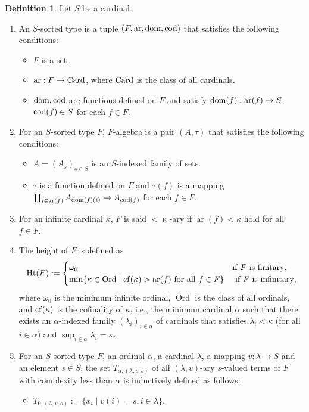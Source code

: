 \documentclass[a4paper,10pt]{article}
\theoremstyle{definition}
\newtheorem{df}{Definition}[section]
\newcommand\ra{\rightarrow}
\DeclareMathOperator{\Ord}{Ord}
\newcommand\mc{\mathclose}
\DeclareMathOperator{\ari}{ar}
\DeclareMathOperator{\Ht}{Ht}
\newcommand\dom{{\rm dom}}
\newcommand\cod{{\rm cod}}
\begin{document}
\begin{df}
Let $S$ be a cardinal.
\begin{enumerate}
\item
An $S$-sorted type is a tuple $(F,\ari,\dom,\cod)$ that satisfies the following conditions:
\begin{itemize}
\item
$F$ is a set.
\item
$\ari:F\ra {\rm Card}$, where ${\rm Card}$ is the class of all cardinals.
\item
$\dom,\cod$ are functions defined on $F$ and satisfy
$\dom(f):\ari(f)\ra S$, $\cod(f)\in S$
for each $f\in F$.
\end{itemize}
\item
For an $S$-sorted type $F$, $F$-algebra is a pair $(A,\tau)$
that satisfies the following conditions:
\begin{itemize}
\item
$A=(A_s)_{s\in S}$ is an $S$-indexed family of sets.
\item
$\tau$ is a function defined on $F$ and
$\tau(f)$ is a mapping $\prod_{i\in\ari(f)}A_{\dom(f)(i)}\ra A_{\cod(f)}$
for each $f\in F$.
\end{itemize}
\item
For an infinite cardinal $\kappa$, $F$ is said $<\mc\kappa$-ary if
$\ari(f)<\kappa$ hold for all $f\in F$.
\item
The height of $F$ is defined as
\[
\Ht(F):=
\begin{cases}
\omega_0& \text{if }F\text{ is finitary},\\
\min\{\kappa\in\Ord\mid {\rm cf}(\kappa) >\ari(f)\text{ for all }f\in F\}& \text{ if }F\text{ is infinitary},
\end{cases}
\]
where $\omega_0$ is the minimum infinite ordinal,
$\Ord$ is the class of all ordinals, and ${\rm cf}(\kappa)$ is
the cofinality of $\kappa$, i.e., the minimum cardinal $\alpha$
such that there exists an $\alpha$-indexed family $(\lambda_i)_{i\in\alpha}$
of cardinals that satisfies $\lambda_i<\kappa$ (for all $i\in\alpha$) and
$\sup_{i\in\alpha} \lambda_i=\kappa$.
\item
For an $S$-sorted type $F$, an ordinal $\alpha$, a cardinal $\lambda$,
a mapping $v:\lambda\ra S$ and an element $s\in S$,
the set $T_{\alpha,(\lambda,v,s)}$ of all $(\lambda,v)$-ary $s$-valued terms of $F$
with complexity less than $\alpha$
is inductively defined as follows:
\begin{itemize}
\item
$T_{0,(\lambda,v,s)}:=\{x_i\mid v(i)=s,i\in\lambda\}$.

\end{itemize}
\end{enumerate}
\end{df}
\end{document}
